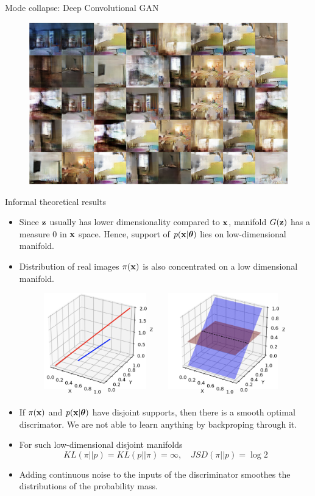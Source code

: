 \begin{frame}{Mode collapse: Deep Convolutional GAN}
	\begin{figure}
		\centering
		\includegraphics[width=\linewidth]{figs/mode_collapse_4}
	\end{figure}
\end{frame}
\begin{frame}{Informal theoretical results}
	\begin{itemize}
		\footnotesize
		\item Since $\mathbf{z}$ usually has lower dimensionality compared to $\mathbf{x}$, manifold $G(\mathbf{z})$ has a measure 0 in $\mathbf{x}$ space. Hence, support of $p(\mathbf{x} | \boldsymbol{\theta})$ lies on low-dimensional manifold.
		\item Distribution of real images $\pi(\mathbf{x})$ is also concentrated on a low dimensional manifold.
		\begin{figure}
			\centering
			\includegraphics[width=0.5\linewidth]{figs/low_dim_manifold}
		\end{figure}
		\item If $\pi(\mathbf{x})$ and $p(\mathbf{x} | \boldsymbol{\theta})$ have disjoint supports, then there is a smooth optimal discrimator. We are not able to learn anything by backproping through it.
		\item For such low-dimensional disjoint manifolds
		\vspace{-0.1cm}
		\[
			KL(\pi || p) = KL(p || \pi) = \infty, \quad JSD(\pi || p) = \log 2
		\]
		\vspace{-0.7cm}
		\item Adding continuous noise to the inputs of the discriminator smoothes the distributions of the probability mass.
	\end{itemize}
\end{frame}

